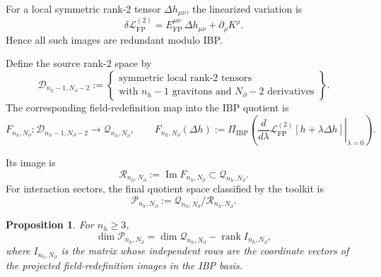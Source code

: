 \documentclass[11pt]{report}
\numberwithin{equation}{chapter}
\newtheorem{proposition}[definition]{Proposition}
\newcommand{\Qspace}[2]{\mathcal{Q}_{#1,#2}}
\newcommand{\Rspace}[2]{\mathcal{R}_{#1,#2}}
\newcommand{\Pspace}[2]{\mathcal{P}_{#1,#2}}
\newcommand{\Dspace}[2]{\mathcal{D}_{#1,#2}}
\newcommand{\Image}{\operatorname{Im}}
\newcommand{\Rank}{\operatorname{rank}}
\newcommand{\ProjIBP}{\Pi_{\mathrm{IBP}}}
\newcommand{\LagFP}{\mathcal{L}_{\mathrm{FP}}^{(2)}}
\begin{document}
For a local symmetric rank-2 tensor \(\Delta h_{\mu\nu}\), the linearized variation is
\begin{equation}
  \delta \LagFP
  =
  E_{\mathrm{FP}}^{\mu\nu}\,\Delta h_{\mu\nu}
  +
  \partial_\rho K^\rho.
  \label{eq:fp_variation}
\end{equation}
Hence all such images are redundant modulo IBP.

Define the source rank-2 space by
\begin{equation}
  \Dspace{n_h-1}{N_\partial-2}
  :=
  \left\{
    \begin{array}{c}
      \text{symmetric local rank-2 tensors} \\
      \text{with \(n_h-1\) gravitons and \(N_\partial-2\) derivatives}
    \end{array}
  \right\}.
  \label{eq:rank2_space}
\end{equation}
The corresponding field-redefinition map into the IBP quotient is
\begin{equation}
  F_{n_h,N_\partial} :
  \Dspace{n_h-1}{N_\partial-2}
  \longrightarrow
  \Qspace{n_h}{N_\partial},
  \qquad
  F_{n_h,N_\partial}(\Delta h)
  :=
  \ProjIBP\!\left(
    \left.
    \frac{d}{d\lambda}
    \LagFP[h+\lambda \Delta h]
    \right|_{\lambda=0}
  \right).
  \label{eq:field_redefinition_map}
\end{equation}

Its image is
\begin{equation}
  \Rspace{n_h}{N_\partial}
  :=
  \Image F_{n_h,N_\partial}
  \subset
  \Qspace{n_h}{N_\partial}.
  \label{eq:image_space}
\end{equation}
For interaction sectors, the final quotient space classified by the toolkit is
\begin{equation}
  \Pspace{n_h}{N_\partial}
  :=
  \Qspace{n_h}{N_\partial} / \Rspace{n_h}{N_\partial}.
  \label{eq:physical_quotient}
\end{equation}

\begin{proposition}
For \(n_h \ge 3\),
\begin{equation}
  \dim \Pspace{n_h}{N_\partial}
  =
  \dim \Qspace{n_h}{N_\partial}
  -
  \Rank I_{n_h,N_\partial},
  \label{eq:physical_dimension_formula}
\end{equation}
where \(I_{n_h,N_\partial}\) is the matrix whose independent rows are the coordinate vectors of the projected field-redefinition images in the IBP basis.
\end{proposition}
\end{document}
